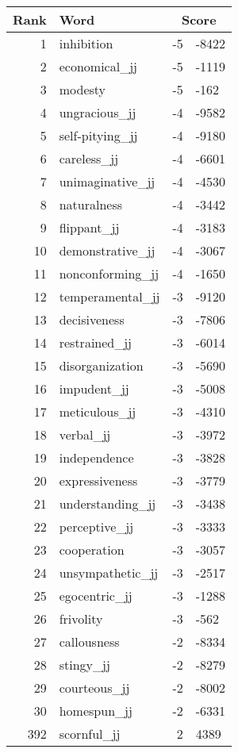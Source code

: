\begin{longtable}[!htbp]{| rlr@{.}l |}
    \hline
    \textbf{Rank} & \textbf{Word} & \multicolumn{2}{c|}{\textbf{Score}} \\
    \hline
    \endhead
    1 & inhibition & -5 & -8422 \\
    2 & economical\_jj & -5 & -1119 \\
    3 & modesty & -5 & -162 \\
    4 & ungracious\_jj & -4 & -9582 \\
    5 & self-pitying\_jj & -4 & -9180 \\
    6 & careless\_jj & -4 & -6601 \\
    7 & unimaginative\_jj & -4 & -4530 \\
    8 & naturalness & -4 & -3442 \\
    9 & flippant\_jj & -4 & -3183 \\
    10 & demonstrative\_jj & -4 & -3067 \\
    11 & nonconforming\_jj & -4 & -1650 \\
    12 & temperamental\_jj & -3 & -9120 \\
    13 & decisiveness & -3 & -7806 \\
    14 & restrained\_jj & -3 & -6014 \\
    15 & disorganization & -3 & -5690 \\
    16 & impudent\_jj & -3 & -5008 \\
    17 & meticulous\_jj & -3 & -4310 \\
    18 & verbal\_jj & -3 & -3972 \\
    19 & independence & -3 & -3828 \\
    20 & expressiveness & -3 & -3779 \\
    21 & understanding\_jj & -3 & -3438 \\
    22 & perceptive\_jj & -3 & -3333 \\
    23 & cooperation & -3 & -3057 \\
    24 & unsympathetic\_jj & -3 & -2517 \\
    25 & egocentric\_jj & -3 & -1288 \\
    26 & frivolity & -3 & -562 \\
    27 & callousness & -2 & -8334 \\
    28 & stingy\_jj & -2 & -8279 \\
    29 & courteous\_jj & -2 & -8002 \\
    30 & homespun\_jj & -2 & -6331 \\
    392 & scornful\_jj & 2 & 4389 \\

\end{longtable}
